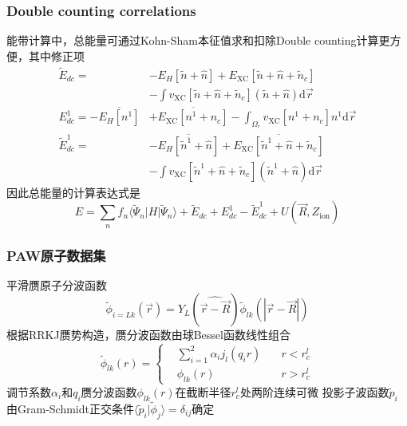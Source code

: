 \documentclass[cjk,slidestop,compress,mathserif,blue]{beamer}
\begin{document}
\frame
{
	\frametitle{Double counting correlations}
	能带计算中，总能量可通过\textrm{Kohn-Sham}本征值求和扣除\textrm{Double counting}计算更方便，其中修正项
	\begin{displaymath}
		\begin{aligned}
			\tilde E_{dc}=&-E_H[\tilde n+\hat n]+E_{\mathrm{XC}}[\tilde n+\hat n+\tilde n_c]\\
			&-\int v_{\mathrm{XC}}[\tilde n+\hat n+\tilde n_c](\tilde n+\hat n)\mathrm{d}\vec r\\
			E_{dc}^1=-\overline{E_H[n^1]}&+\overline{E_{\mathrm{XC}}[n^1+n_c]}-\int_{\Omega_r}v_{\mathrm{XC}}[n^1+n_c]n^1\mathrm{d}\vec r\\
			\tilde E_{dc}^1=&-\overline{E_H[\tilde n^1+\hat n]}+\overline{E_{\mathrm{XC}}[\tilde n^1+\hat n+\tilde n_c]}\\
			&-\int v_{\mathrm{XC}}[\tilde n^1+\hat n+\tilde n_c](\tilde n^1+\hat n)\mathrm{d}\vec r
		\end{aligned}
	\end{displaymath}
	因此总能量的计算表达式是
	$$E=\sum_nf_n\langle\tilde\Psi_n|H|\tilde\Psi_n\rangle+\tilde E_{dc}+E_{dc}^1-\tilde E_{dc}^1+U(\vec R,Z_{\mathrm{ion}})$$
}

\frame
{
	\frametitle{\textrm{PAW}原子数据集}
	平滑赝原子分波函数
	\begin{displaymath}
		\tilde\phi_{i=Lk}(\vec r)=Y_L(\widehat{\vec r-\vec R})\tilde\phi_{lk}(|\vec r-\vec R|)
	\end{displaymath}
	根据\textrm{RRKJ}赝势构造，赝分波函数由球\textrm{Bessel}函数线性组合
	\begin{displaymath}
		\tilde\phi_{lk}(r)=\left\{
		\begin{aligned}
			&\sum_{i=1}^2\alpha_ij_l(q_ir)\quad &r<r_c^l\\
			&\phi_{lk}(r)\quad&r>r_c^l
		\end{aligned}
		\right.
	\end{displaymath}
	调节系数$\alpha_i$和$q_i$赝分波函数$\phi_{lk}(r)$在截断半径$r_c^l$处两阶连续可微
	投影子波函数$\tilde p_i$由\textrm{Gram-Schmidt}正交条件$\langle\tilde p_i|\tilde\phi_j\rangle=\delta_{ij}$确定
}
\end{document}

